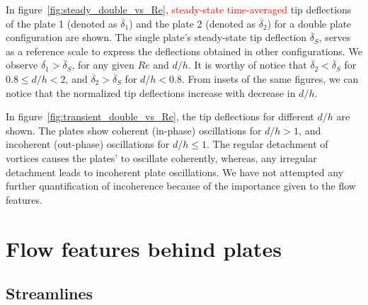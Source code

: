 \documentclass[aps,pre,twocolumn,aps,longbibliography]{revtex4-1}
\begin{document}
	In figure~\ref{fig:steady_double_vs_Re}, \textcolor{red}{steady-state time-averaged} tip deflections of the plate 1 (denoted as $\overline{\delta}_1$) and the plate 2 (denoted as $\overline{\delta}_2$) for a double plate configuration are shown. The single plate's steady-state tip deflection $\overline{\delta}_S$, serves as a reference scale to express the deflections obtained in other configurations. We observe $\overline{\delta_1}>\overline{\delta}_S$, for any given $Re$ and $d/h$. It is worthy of notice that $\overline{\delta}_2 < \overline{\delta}_S$ for $0.8\le d/h<2$, and $\overline{\delta}_2>\overline{\delta}_S$ for $d/h<0.8$. From insets of the same figures, we can notice that the normalized tip deflections increase with decrease in $d/h$.
	
	In figure~\ref{fig:transient_double_vs_Re}, the tip deflections for different $d/h$ are shown. The plates show coherent (in-phase) oscillations for $d/h>1$, and incoherent (out-phase) oscillations for $d/h\le1$. The regular detachment of vortices causes the plates' to oscillate coherently, whereas, any irregular detachment leads to incoherent plate oscillations. We have not attempted any further quantification of incoherence because of the importance given to the flow features.
	
	
	\section{Flow features behind plates}
	
	
	\subsection{Streamlines}
	
\end{document}

